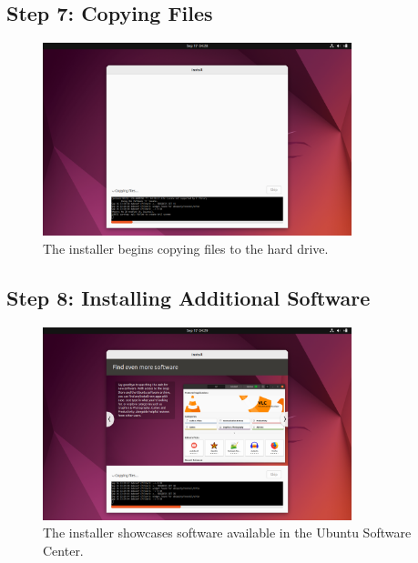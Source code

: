 \documentclass{article}
\begin{document}
\subsection{Step 7: Copying Files}
\begin{figure}[H]
    \centering
    \includegraphics[width=0.8\textwidth]{2024-09-17_04-28-52.png}
    \caption{The installer begins copying files to the hard drive.}
\end{figure}

\subsection{Step 8: Installing Additional Software}
\begin{figure}[H]
    \centering
    \includegraphics[width=0.8\textwidth]{2024-09-17_04-29-53.png}
    \caption{The installer showcases software available in the Ubuntu Software Center.}
\end{figure}
\end{document}
